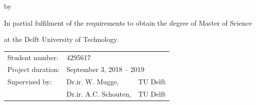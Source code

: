 \begin{titlepage}


\begin{center}


{\makeatletter
\largetitlestyle\fontsize{48}{68}\selectfont\@title
\makeatother}

\bigskip

{\makeatletter
\ifx\@subtitle\undefined\else
    \bigskip
  {\tudsffamily\fontsize{22}{32}\selectfont\@subtitle}    
\fi
\makeatother}

\bigskip
\bigskip

by

\bigskip
\bigskip

{\makeatletter
\largetitlestyle\fontsize{26}{26}\selectfont\@author
\makeatother}

\bigskip
\bigskip

In partial fulfilment of the requirements to obtain the degree of Master of Science

at the Delft University of Technology.


\vfill

\begin{tabular}{lll}
    Student number: & 4295617 \\
    Project duration: & \multicolumn{2}{l}{September 3, 2018 -- 2019} \\
    Supervised by: & Dr.ir. W. Mugge, & TU Delft \\
        & Dr.ir. A.C. Schouten, & TU Delft \\
\end{tabular}


\bigskip
\bigskip


\end{center}
\end{titlepage}
